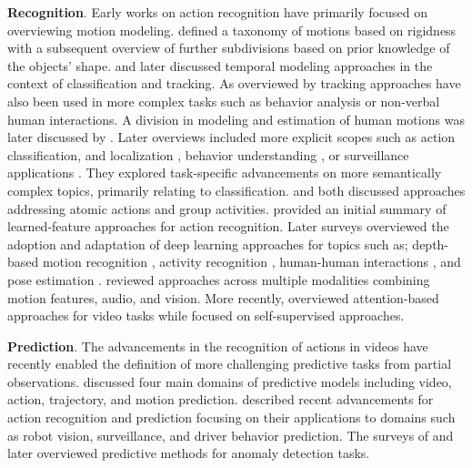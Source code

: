 \documentclass[smallextended,twocolumn,natbib]{svjour3}
\begin{document}
\noindent
\textbf{Recognition}. Early works on action recognition have primarily focused on overviewing motion modeling. \citet{aggarwal1994articulated} defined a taxonomy of motions based on rigidness with a subsequent overview \citep{aggarwal1998nonrigid} of further subdivisions based on prior knowledge of the objects' shape. \citet{cedras1995motion} and later \citet{moeslund2001survey} discussed temporal modeling approaches in the context of classification and tracking. As overviewed by \citet{buxton2003learning} tracking approaches have also been used in more complex tasks such as behavior analysis or non-verbal human interactions. A division in modeling and estimation of human motions was later discussed by \citet{poppe2007vision}. 
Later overviews included more explicit scopes such as action classification, and localization \citep{weinland2011survey}, behavior understanding \citep{chaaraoui2012review}, or surveillance applications \citep{vishwakarma2013survey}. They explored task-specific advancements on more semantically complex topics, primarily relating to classification. \citet{turaga2008machine} and \citet{poppe2010survey} both discussed approaches addressing atomic actions and group activities. \citet{herath2017going} provided an initial summary of learned-feature approaches for action recognition. Later surveys overviewed the adoption and adaptation of deep learning approaches for topics such as; depth-based motion recognition \citep{wang2018rgb}, activity recognition \citep{beddiar2020vision}, human-human interactions \citep{stergiou2019analyzing}, and pose estimation \citep{zheng2020deep}. \citet{sun2022human} reviewed approaches across multiple modalities combining motion features, audio, and vision. More recently, \citet{selva2023video} overviewed attention-based approaches for video tasks while \citet{schiappa2023self} focused on self-supervised approaches.

\noindent
\textbf{Prediction}. The advancements in the recognition of actions in videos have recently enabled the definition of more challenging predictive tasks from partial observations. \citet{rasouli2020deep} discussed four main domains of predictive models including video, action, trajectory, and motion prediction. \citet{kong2022human} described recent advancements for action recognition and prediction focusing on their applications to domains such as robot vision, surveillance, and driver behavior prediction. The surveys of \citet{dhiman2019review} and later \citet{ramachandra2020survey} overviewed predictive methods for anomaly detection tasks.
\end{document}
